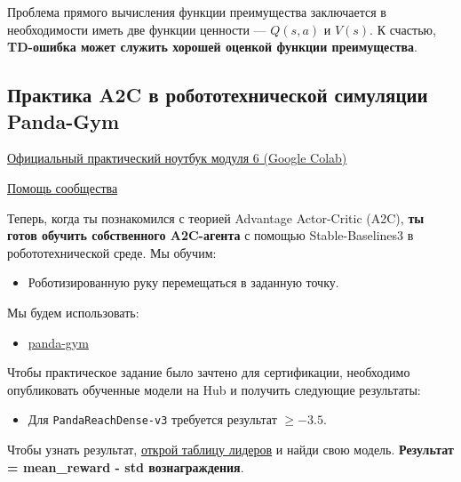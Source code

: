 \documentclass[11pt,a4paper]{article}
\begin{document}
Проблема прямого вычисления функции преимущества заключается в необходимости иметь две функции ценности --- \(Q(s,a)\) и \(V(s)\). К счастью, \textbf{TD-ошибка может служить хорошей оценкой функции преимущества}.


\subsection{Практика A2C в робототехнической симуляции Panda-Gym}\label{advantage-actor-critic-a2c-using-robotics-simulations-with-panda-gym}

\href{https://colab.research.google.com/github/huggingface/deep-rl-class/blob/main/notebooks/unit6/unit6.ipynb}{Официальный практический ноутбук модуля 6 (Google Colab)}

\href{http://hf.co/join/discord}{Помощь сообщества}

Теперь, когда ты познакомился с теорией Advantage Actor-Critic (A2C), \textbf{ты готов обучить собственного A2C-агента} с помощью Stable-Baselines3 в робототехнической среде. Мы обучим:

\begin{itemize}
\tightlist
\item
  Роботизированную руку перемещаться в заданную точку.
\end{itemize}

Мы будем использовать:

\begin{itemize}
\tightlist
\item
  \href{https://github.com/qgallouedec/panda-gym}{panda-gym}
\end{itemize}

Чтобы практическое задание было зачтено для сертификации, необходимо опубликовать обученные модели на Hub и получить следующие результаты:

\begin{itemize}
\tightlist
\item
  Для \texttt{PandaReachDense-v3} требуется результат \(\ge -3.5\).
\end{itemize}

Чтобы узнать результат, \href{https://huggingface.co/spaces/huggingface-projects/Deep-Reinforcement-Learning-Leaderboard}{открой таблицу лидеров} и найди свою модель. \textbf{Результат = mean\_reward - std вознаграждения}.
\end{document}
